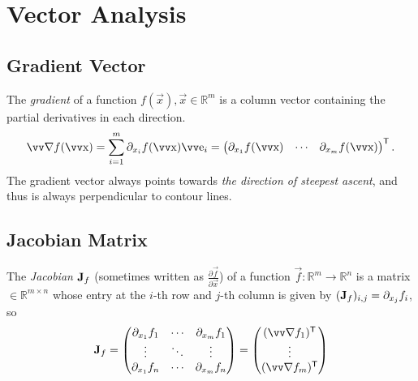 
\section{Vector Analysis}

\subsection{Gradient Vector}

The \emph{gradient} of a function \(f(\vec{x}), \vec{x}\in\mathbb{R}^m\) is a column vector containing the partial derivatives in each direction.
\[
\grad f (\vec{x}) = \sum_{i=1}^m \partial_{x_i} f(\vec{x}) \vec{e}_i
	= \begin{pmatrix}
		\partial_{x_1} f(\vec{x}) &
		\cdots &
		\partial_{x_m} f(\vec{x})
	\end{pmatrix}^\mathsf{T}.
\]
The gradient vector always points towards \emph{the direction of steepest ascent}, and thus is always perpendicular to contour lines.

\subsection{Jacobian Matrix}

The \emph{Jacobian} \(\bm{\mathrm{J}}_f\) (sometimes written as \(\frac{\partial \vec{f}}{\partial \vec{x}}\)) of a function \(\vec{f}: \mathbb{R}^m \to \mathbb{R}^n\) is a matrix \(\in\mathbb{R}^{m\times n}\) whose entry at the \(i\)-th row and \(j\)-th column is given by \((\bm{\mathrm{J}}_f)_{i,j} = \partial_{x_j} f_i\), so
\[
	\mx{J}_f = \begin{pmatrix}
			\partial_{x_1} f_1 & \cdots & \partial_{x_m} f_1 \\
			\vdots & \ddots & \vdots \\
			\partial_{x_1} f_n & \cdots & \partial_{x_m} f_n \\
		\end{pmatrix}
	= \begin{pmatrix}
			(\grad f_1)^\mathsf{T} \\
			\vdots \\
			(\grad f_m)^\mathsf{T} \\
		\end{pmatrix}
\]
